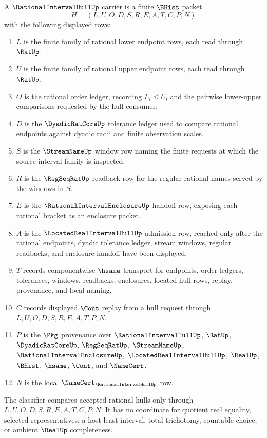 \begin{definition}
\label{def:rational-interval-hull-carrier}
A $\RationalIntervalHullUp$ carrier is a finite $\BHist$ packet
$$
H=(L,U,O,D,S,R,E,A,T,C,P,N)
$$
with the following displayed rows:
\begin{enumerate}
\item $L$ is the finite family of rational lower endpoint rows, each read through $\RatUp$.
\item $U$ is the finite family of rational upper endpoint rows, each read through $\RatUp$.
\item $O$ is the rational order ledger, recording $L_i \leq U_i$ and the pairwise lower-upper comparisons requested by the hull consumer.
\item $D$ is the $\DyadicRatCoreUp$ tolerance ledger used to compare rational endpoints against dyadic radii and finite observation scales.
\item $S$ is the $\StreamNameUp$ window row naming the finite requests at which the source interval family is inspected.
\item $R$ is the $\RegSeqRatUp$ readback row for the regular rational names served by the windows in $S$.
\item $E$ is the $\RationalIntervalEnclosureUp$ handoff row, exposing each rational bracket as an enclosure packet.
\item $A$ is the $\LocatedRealIntervalHullUp$ admission row, reached only after the rational endpoints, dyadic tolerance ledger, stream windows, regular readbacks, and enclosure handoff have been displayed.
\item $T$ records componentwise $\hsame$ transport for endpoints, order ledgers, tolerances, windows, readbacks, enclosures, located hull rows, replay, provenance, and local naming.
\item $C$ records displayed $\Cont$ replay from a hull request through $L,U,O,D,S,R,E,A,T,P,N$.
\item $P$ is the $\Pkg$ provenance over $\RationalIntervalHullUp$, $\RatUp$, $\DyadicRatCoreUp$, $\RegSeqRatUp$, $\StreamNameUp$, $\RationalIntervalEnclosureUp$, $\LocatedRealIntervalHullUp$, $\RealUp$, $\BHist$, $\hsame$, $\Cont$, and $\NameCert$.
\item $N$ is the local $\NameCert_{\RationalIntervalHullUp}$ row.
\end{enumerate}
The classifier compares accepted rational hulls only through $L,U,O,D,S,R,E,A,T,C,P,N$. It has no coordinate for quotient real equality, selected representatives, a host least interval, total trichotomy, countable choice, or ambient $\RealUp$ completeness.
\end{definition}

